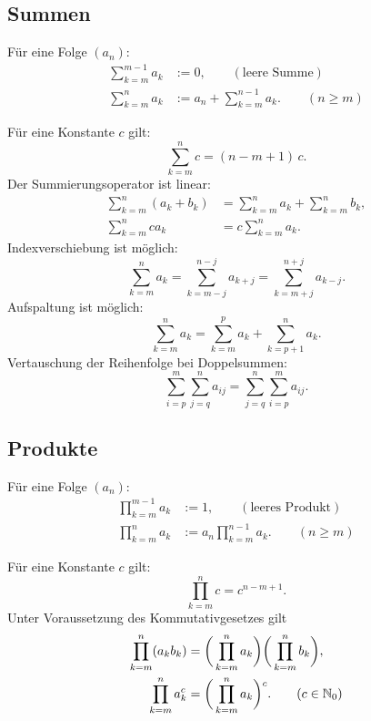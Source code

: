 \subsection{Summen}
\begin{definition}[Summe]\mbox{}\newline
Für eine Folge $(a_n)$:
\begin{align}
\sum_{k=m}^{m-1} a_k &:= 0,\qquad(\text{leere Summe})\\
\sum_{k=m}^n a_k &:= a_n+\sum_{k=m}^{n-1} a_k.\qquad(n\ge m)
\end{align}
\end{definition}
\noindent
Für eine Konstante $c$ gilt:
\begin{equation}
\sum_{k=m}^n c = (n-m+1)\,c.
\end{equation}
Der Summierungsoperator ist linear:
\begin{align}
\sum_{k=m}^n (a_k+b_k) &= \sum_{k=m}^n a_k + \sum_{k=m}^n b_k,\\
\sum_{k=m}^n ca_k &= c\sum_{k=m}^n a_k.
\end{align}
Indexverschiebung ist möglich:
\begin{equation}
\sum_{k=m}^n a_k = \sum_{k=m-j}^{n-j} a_{k+j} = \sum_{k=m+j}^{n+j} a_{k-j}.
\end{equation}
Aufspaltung ist möglich:
\begin{equation}
\sum_{k=m}^n a_k = \sum_{k=m}^p a_k + \sum_{k=p+1}^n a_k.
\end{equation}
Vertauschung der Reihenfolge bei Doppelsummen:
\begin{equation}
\sum_{i=p}^m \sum_{j=q}^n a_{ij} = \sum_{j=q}^n \sum_{i=p}^m a_{ij}.
\end{equation}

\subsection{Produkte}
\begin{definition}[Produkt]\mbox{}\newline
Für eine Folge $(a_n)$:
\begin{align}
\prod_{k=m}^{m-1} a_k &:= 1,\qquad(\text{leeres Produkt})\\
\prod_{k=m}^n a_k &:= a_n\prod_{k=m}^{n-1} a_k.\qquad(n\ge m)
\end{align}
\end{definition}

\noindent
Für eine Konstante $c$ gilt:
\begin{equation}
\prod_{k=m}^n c = c^{n-m+1}.
\end{equation}
Unter Voraussetzung des Kommutativgesetzes gilt
\begin{align}
\label{eq:product-product}
\prod_{k=m}^n (a_k b_k) &= \bigg(\prod_{k=m}^n a_k\bigg)\bigg(\prod_{k=m}^n b_k\bigg),\\
\label{eq:product-power}
\prod_{k=m}^n a_k^c &= \bigg(\prod_{k=m}^n a_k\bigg)\Big.^c.\qquad (c\in\mathbb N_0)
\end{align}

